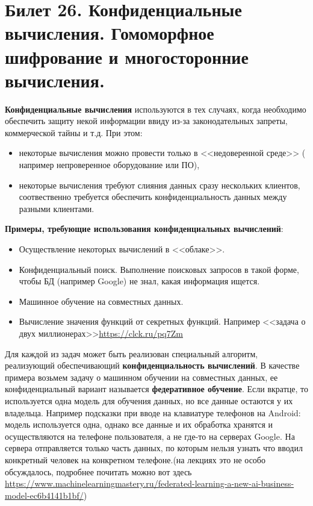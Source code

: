 \newpage
\section {Билет 26. Конфиденциальные вычисления. Гомоморфное шифрование и многосторонние вычисления.}

\textbf{Конфиденциальные вычисления} используются в тех случаях, когда необходимо обеспечить защиту некой информации ввиду из-за законодательных запреты, коммерческой тайны и т.д. При этом:
\begin{itemize}
\item некоторые вычисления можно провести только в <<недоверенной среде>> (
например непроверенное оборудование или ПО),
\item некоторые вычисления требуют слияния данных сразу нескольких клиентов, соотвественно требуется обеспечить конфиденциальность данных между разными клиентами. 
\end{itemize}

\textbf{Примеры, требующие использования конфиденциальных вычислений}:
\begin{itemize}
	\item Осуществление некоторых вычислений в <<облаке>>.
	\item Конфиденциальный поиск. Выполнение поисковых запросов в такой форме, чтобы БД (например Google) не знал, какая информация ищется.
	\item Машинное обучение на совместных данных.
	\item Вычисление значения функций от секретных функций. Например <<задача о двух миллионерах>>\url{https://clck.ru/pq7Zm}
\end{itemize}

Для каждой из задач может быть реализован специальный алгоритм, реализующий обеспечивающий \textbf{конфиденциальность вычислений}. В качестве примера возьмем задачу о  машинном обучении на совместных данных, ее конфиденциальный вариант называется \textbf{федеративное обучение}. Если вкратце, то используется одна модель для обучения данных, но все данные остаются у их владельца. Например подсказки при вводе на клавиатуре телефонов на Android: модель используется одна, однако все данные и их обработка хранятся и осуществляются на телефоне пользователя, а не где-то на серверах Google. На сервера отправляется только часть данных, по которым нельзя узнать что вводил конкретный человек на конкретном телефоне.(на лекциях это не особо обсуждалось, подробнее почитать можно вот здесь \url{https://www.machinelearningmastery.ru/federated-learning-a-new-ai-business-model-ec6b4141b1bf/})

